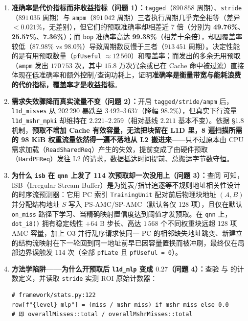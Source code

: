 \documentclass[12pt,a4paper,fontset=mac]{ctexart}
\begin{document}
\begin{enumerate}
  \item \textbf{准确率是代价指标而非收益指标（问题 1）：}\texttt{tagged}（$890\,858$ 周期）、\texttt{stride}（$891\,035$ 周期）与 \texttt{ampm}（$891\,042$ 周期）三者执行周期几乎完全相等（差异 $<0.021\%$，无差别），但它们的预取准确率却相差近 7 倍（分别为 \textbf{49.76\%}、\textbf{25.57\%}、\textbf{7.36\%}）；而 \texttt{bop} 准确率高达 \textbf{99.38\%}（相差十余倍），却因覆盖率较低（87.98\% vs 98.0\%）导致周期数反慢于三者（$913\,451$ 周期）。决定性能的是有用预取数量（\texttt{pfUseful} $\approx 12\,560$）和覆盖率；而发出的多余无用预取（\texttt{ampm} 发出 $170\,753$ 次，其中 $15.8$ 万次冗余或已在 Cache 命中被过滤）直接体现在低准确率和额外控制/查询功耗上，证明\textbf{准确率是衡量带宽与能耗浪费的代价指标，覆盖率才是收益指标}。
  \item \textbf{需求失效骤降而真实流量不变（问题 2）：}开启 \texttt{tagged/stride/ampm} 后，\texttt{l1d\_misses} 从 $202\,290$ 暴跌至 $3\,492$--$3\,637$（降幅 98.2\%），但真实下行流量 \texttt{l1d\_mshr\_mpki} 却维持在 $2.221$--$2.259$（相对基线 $2.211$ 基本不变）。依据 §1.8 机制，\textbf{预取不增加 Cache 有效容量，无法把块留在 L1D 里，8 遍扫描所需的 98 KiB 权重流量依然得一遍不落地从 L2 搬进来}——只不过原本由 CPU 需求加载（\texttt{ReadSharedReq}）产生的失效，提前变成了由硬件预取（\texttt{HardPFReq}）发往 L2 的请求，数据抵达时间提前、总搬运字节数守恒。
  \item \textbf{为什么 \texttt{isb} 在 \texttt{qnn} 上发了 114 次预取却一次没用上（问题 3）：}查阅  可知，ISB（Irregular Stream Buffer）是为链表/指针追逐等不规则地址相关性设计的时序流预测器：它用 PC 索引 \texttt{TrainingUnit} 配对前后物理块地址 $(A, B)$ 并分配结构地址 $S$ 写入 PS-AMC/SP-AMC（默认各仅 128 项），且仅在默认 \texttt{on\_miss} 路径下学习、当精确映射置信度达到阈值才发预取。在 \texttt{qnn} 上，\texttt{dot\_i8()} 拥有稳定线性 $+64\text{ B}$ 步长、高达 $1\,568$ 个不同权重块远超 128 项 AMC 容量，加上 O3 并行乱序请求使同一 PC 的相邻缺失地址跳变、新建立的结构流映射在下一轮回到同一地址前早已因容量置换而被冲刷，最终仅在局部边界误触发 114 次（全部 \texttt{pfLate} 且 \texttt{pfUseful = 0}）。
  \item \textbf{方法学陷阱——为什么开预取后 \texttt{l1d\_mlp} 变成 $0.27$（问题 4）：}查验  与  的计数定义，并读取 \texttt{stride} 实测 ROI 原始计数器：
  \begin{lstlisting}[language={},caption={任务 4 方法学陷阱：framework/stats.py 与 gem5/base.cc 口径及 stride 实测计数}]
# framework/stats.py:122
row[f"{level}_mlp"] = (miss / mshr_miss) if mshr_miss else 0.0
# 即 overallMisses::total / overallMshrMisses::total


\end{lstlisting}
\end{enumerate}
\end{document}
